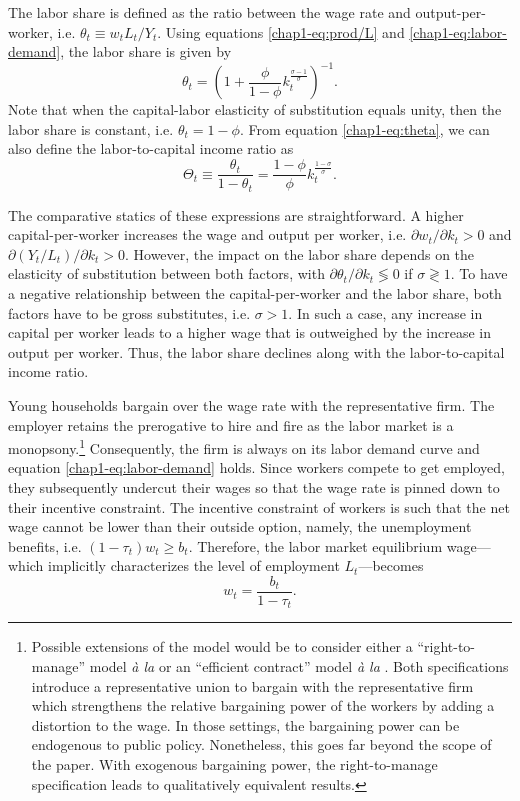 The labor share is defined as the ratio between the wage rate and output-per-worker, i.e. $\theta_t \equiv w_tL_t/Y_t$.
%
Using equations \eqref{chap1-eq:prod/L} and \eqref{chap1-eq:labor-demand}, the labor share is given by
\begin{equation}\label{chap1-eq:theta}
	\theta_t = \left(1+\frac{\phi}{1-\phi}k_t^{\frac{\sigma-1}{\sigma}}\right)^{-1}.
\end{equation}
%
Note that when the capital-labor elasticity of substitution equals unity, then the labor share is constant, i.e. $\theta_t=1-\phi$.
%
From equation \eqref{chap1-eq:theta}, we can also define the labor-to-capital income ratio as
\begin{equation}\label{chap1-eq:Theta}
	\Theta_t \equiv \frac{\theta_t}{1-\theta_t} = \frac{1-\phi}{\phi}k_t^{\frac{1-\sigma}{\sigma}}.
\end{equation}

The comparative statics of these expressions are straightforward. A higher capital-per-worker increases the wage and output per worker, i.e. $\partial w_t/\partial k_t > 0$ and $\partial (Y_t/L_t)/\partial k_t > 0$. However, the impact on the labor share depends on the elasticity of substitution between both factors, with $\partial \theta_t/\partial k_t \lessgtr 0$ if $\sigma \gtrless 1$. To have a negative relationship between the capital-per-worker and the labor share, both factors have to be gross substitutes, i.e. $\sigma > 1$. In such a case, any increase in capital per worker leads to a higher wage that is outweighed by the increase in output per worker. Thus, the labor share declines along with the labor-to-capital income ratio.

Young households bargain over the wage rate with the representative firm. The employer retains the prerogative to hire and fire as the labor market is a monopsony.\footnote{Possible extensions of the model would be to consider either a ``right-to-manage'' model \textit{à la} \citet{Nickell1983Unions} or an ``efficient contract'' model \textit{à la} \citet{McDonald1981Wage}. Both specifications introduce a representative union to bargain with the representative firm which strengthens the relative bargaining power of the workers by adding a distortion to the wage. In those settings, the bargaining power can be endogenous to public policy. Nonetheless, this goes far beyond the scope of the paper. With exogenous bargaining power, the right-to-manage specification leads to qualitatively equivalent results.} Consequently, the firm is always on its labor demand curve and equation \eqref{chap1-eq:labor-demand} holds. Since workers compete to get employed, they subsequently undercut their wages so that the wage rate is pinned down to their incentive constraint. The incentive constraint of workers is such that the net wage cannot be lower than their outside option, namely, the unemployment benefits, i.e. $(1-\tau_t)w_t \geq b_t$. Therefore, the labor market equilibrium wage---which implicitly characterizes the level of employment $L_t$---becomes
\begin{equation}\label{chap1-eq:labor-market}
    w_t = \frac{b_t}{1-\tau_t}.
\end{equation}

